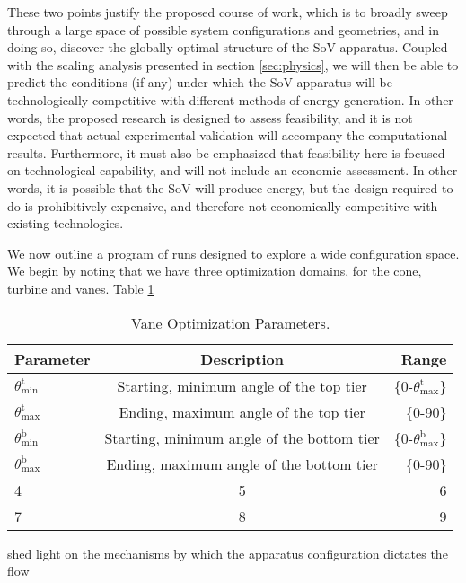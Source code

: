 These two points justify the proposed course of work, which is to
broadly sweep through a large space of possible system configurations
and geometries, and in doing so, discover the globally optimal structure
of the SoV apparatus. Coupled with the scaling analysis presented in
section \ref{sec:physics}, we will then be able to predict the
conditions (if any) under which the SoV apparatus will be
technologically competitive with different methods of energy
generation. In other words, the proposed research is designed to assess
feasibility, and it is not expected that actual experimental validation
will accompany the computational results. Furthermore, it must also be
emphasized that feasibility here is focused on technological capability,
and will not include an economic assessment. In other words, it is
possible that the SoV will produce energy, but the design required to do
is prohibitively expensive, and therefore not economically competitive
with existing technologies. 

%
%

%
%

%
%
We now outline a program of runs designed to explore a wide
configuration space. We begin by noting that we have three 
optimization domains, for the cone, turbine and vanes. Table \ref{tab:params}
\begin{center}
\begin{table}[h]
  \begin{tabular}{| l | c | r |}
    \hline
    Parameter & Description & Range \\
    \hline
    $\theta^{\text{t}}_{\text{min}}$ & Starting, minimum angle of the top tier & \{0-$\theta^{\text{t}}_{\text{max}}$\} \\
    $\theta^{\text{t}}_{\text{max}}$ & Ending, maximum angle of the top tier & \{0-90\} \\
    $\theta^{\text{b}}_{\text{min}}$ & Starting, minimum angle of the bottom tier & \{0-$\theta^{\text{b}}_{\text{max}}$\} \\
    $\theta^{\text{b}}_{\text{max}}$ & Ending, maximum angle of the bottom tier & \{0-90\} \\

    4 & 5 & 6 \\
    7 & 8 & 9 \\
    \hline
  \end{tabular}
  \caption{Vane Optimization Parameters.}
  \label{tab:params}
\end{table}
\end{center}
shed light on 
the mechanisms by which the apparatus configuration dictates the flow 

